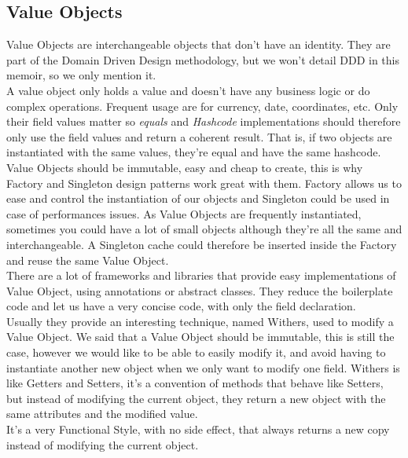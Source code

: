 \subsection{Value Objects}\label{subsec:value-objects}
Value Objects are interchangeable objects that don't have an identity.
They are part of the Domain Driven Design methodology, but we won't
detail DDD in this memoir, so we only mention it. \\
\newline
A value object only holds a value and doesn't have any business logic
or do complex operations.
Frequent usage are for currency, date, coordinates, etc.
Only their field values matter so \textit{equals} and \textit{Hashcode}
implementations should therefore only use the field values and return
a coherent result.
That is, if two objects are instantiated with the same values, they're
equal and have the same hashcode. \\
\newline
Value Objects should be immutable, easy and cheap to create, this is why
Factory and Singleton design patterns work great with them.
Factory allows us to ease and control the instantiation of our objects
and Singleton could be used in case of performances issues.
As Value Objects are frequently instantiated, sometimes you could have
a lot of small objects although they're all the same and interchangeable.
A Singleton cache could therefore be inserted inside the Factory and
reuse the same Value Object. \\
\newline
There are a lot of frameworks and libraries that provide easy
implementations of Value Object, using annotations or abstract classes.
They reduce the boilerplate code and let us have a very concise code,
with only the field declaration. \\
Usually they provide an interesting technique, named Withers, used to
modify a Value Object.
We said that a Value Object should be immutable, this is still the case,
however we would like to be able to easily modify it, and avoid having
to instantiate another new object when we only want to modify one field.
Withers is like Getters and Setters, it's a convention of methods that
behave like Setters, but instead of modifying the current object,
they return a new object with the same attributes and the modified
value. \\
It's a very Functional Style, with no side effect, that always returns
a new copy instead of modifying the current object.

